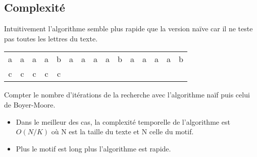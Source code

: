 \documentclass[a4paper,11pt]{article}
\begin{document}
\subsection{Complexité}
Intuitivement l'algorithme semble plus rapide que la version naïve car il ne teste pas toutes les lettres du texte.
\begin{center}
    \begin{tabular}{*{15}{c}}
        a&a&a&a&b&a&a&a&a&b&a&a&a&a&b\\
        c&c&c&c&c&&&&&&&&&&\\
    \end{tabular}
\end{center}
\begin{activite}
Compter le nombre d'itérations de la recherche avec l'algorithme naïf puis celui de Boyer-Moore.
\end{activite}
\begin{aretenir}[Remarques]
\begin{itemize}
    \item Dans le meilleur des cas, la complexité temporelle de l'algorithme est $O(N/K)$ où N est la taille du texte et N celle du motif.
    \item Plus le motif est long plus l'algorithme est rapide.
\end{itemize}
\end{aretenir}
\end{document}
